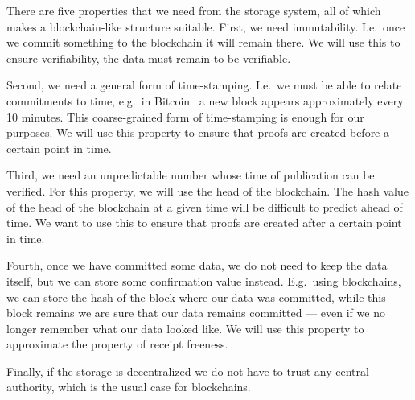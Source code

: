 There are five properties that we need from the storage system, all of which 
makes a blockchain-like structure suitable.
First, we need immutability.
I.e.\ once we commit something to the blockchain it will remain there.
We will use this to ensure verifiability, the data must remain to be verifiable.

Second, we need a general form of time-stamping.
I.e.\ we must be able to relate commitments to time, e.g.\ in 
Bitcoin~\cite{Bitcoin} a new block appears approximately every 10 minutes.
This coarse-grained form of time-stamping is enough for our purposes.
We will use this property to ensure that proofs are created before a certain 
point in time.

Third, we need an unpredictable number whose time of publication can be 
verified.
For this property, we will use the head of the blockchain.
The hash value of the head of the blockchain at a given time will be difficult 
to predict ahead of time.
We want to use this to ensure that proofs are created after a certain point in 
time.

Fourth, once we have committed some data, we do not need to keep the data 
itself, but we can store some confirmation value instead.
E.g.\ using blockchains, we can store the hash of the block where our data was 
committed, while this block remains we are sure that our data remains committed 
--- even if we no longer remember what our data looked like.
We will use this property to approximate the property of receipt freeness.

Finally, if the storage is decentralized we do not have to trust any central 
authority, which is the usual case for blockchains.

